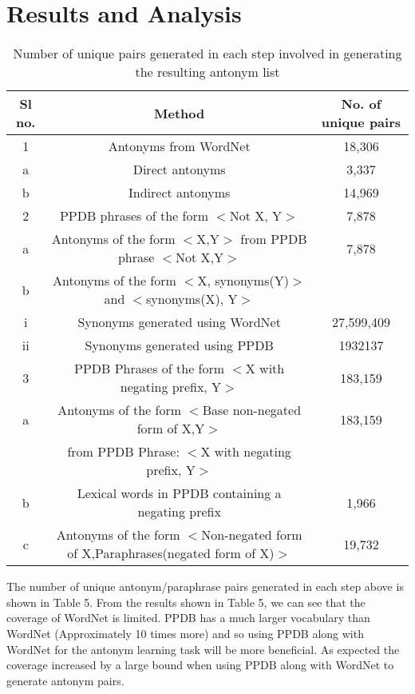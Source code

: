 \documentclass[11pt]{article}
\begin{document}
\section{ Results and Analysis}
\begin{table*}[h!]
 \begin{tabular}{|c | c | c|} 
 \hline
 Sl no. & Method & No. of unique pairs \\ [0.5ex]
 \hline\hline
 1 & Antonyms from WordNet & 18,306\\
 a & Direct antonyms & 3,337\\
 b & Indirect antonyms & 14,969\\
 \hline
 2 & PPDB phrases of the form $<$Not X, Y$>$ & 7,878\\
 a & Antonyms of the form $<$X,Y$>$ from PPDB phrase $<$Not X,Y$>$ & 7,878\\
 b & Antonyms of the form $<$X, synonyms(Y)$>$ and $<$synonyms(X), Y$>$ &  \\
  i &  Synonyms generated using WordNet & 27,599,409\\
  ii & Synonyms generated using PPDB & 1932137\\
 \hline
 3 & PPDB Phrases of the form $<$X with negating prefix, Y$>$ & 183,159\\
 a & Antonyms of the form $<$Base non-negated form of X,Y$>$ & 183,159\\
  & from PPDB Phrase: $<$X with negating prefix, Y$>$ & \\
 b & Lexical words in PPDB containing a negating prefix
 & 1,966\\ 
 c & Antonyms of the form $<$Non-negated form of X,Paraphrases(negated form of X)$>$ & 19,732\\
 \hline
\end{tabular}
\caption{Number of unique pairs generated in each step involved in generating the resulting antonym list}
\end{table*}
The number of unique antonym/paraphrase pairs generated in each step above is shown in Table 5.
From the results shown in Table 5, we can see that the coverage of WordNet is limited. PPDB has a much larger vocabulary than WordNet (Approximately 10 times more) and so using PPDB along with WordNet for the antonym learning task will be more beneficial. As expected the coverage increased by a large bound when using PPDB along with WordNet to generate antonym pairs. 
\end{document}
